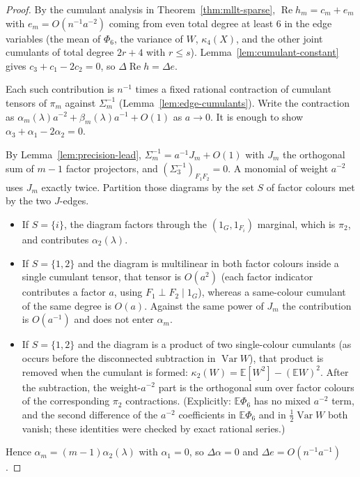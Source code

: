 \documentclass[11pt]{article}
\newcommand{\EE}{\mathbb{E}}
\begin{document}
\begin{proof}
By the cumulant analysis in Theorem~\ref{thm:mllt-sparse},
\(\operatorname{Re}h_m=c_m+e_m\) with \(e_m=O(n^{-1}a^{-2})\) coming from even
total degree at least \(6\) in the edge variables (the mean of
\(\Phi_6\), the variance of \(W\), \(\kappa_4(X)\), and the other joint
cumulants of total degree \(2r+4\) with \(r\le s\)).
Lemma~\ref{lem:cumulant-constant} gives \(c_3+c_1-2c_2=0\), so
\(\Delta\operatorname{Re}h=\Delta e\).

Each such contribution is \(n^{-1}\) times a fixed rational contraction of
cumulant tensors of \(\pi_m\) against \(\Sigma_m^{-1}\) (Lemma~\ref{lem:edge-cumulants}).
Write the contraction as \(\alpha_m(\lambda)a^{-2}+\beta_m(\lambda)a^{-1}+O(1)\)
as \(a\to0\). It is enough to show \(\alpha_3+\alpha_1-2\alpha_2=0\).

By Lemma~\ref{lem:precision-lead}, \(\Sigma_m^{-1}=a^{-1}J_m+O(1)\) with
\(J_m\) the orthogonal sum of \(m-1\) factor projectors, and
\((\Sigma_3^{-1})_{F_1F_2}=0\). A monomial of weight \(a^{-2}\) uses
\(J_m\) exactly twice. Partition those diagrams by the set \(S\) of factor
colours met by the two \(J\)-edges.
\begin{itemize}
\item If \(S=\{i\}\), the diagram factors through the
\((1_G,1_{F_i})\) marginal, which is \(\pi_2\), and contributes
\(\alpha_2(\lambda)\).
\item If \(S=\{1,2\}\) and the diagram is multilinear in both factor
colours inside a single cumulant tensor, that tensor is \(O(a^2)\)
(each factor indicator contributes a factor \(a\), using
\(F_1\perp F_2\mid 1_G\)), whereas a same-colour cumulant of the same
degree is \(O(a)\). Against the same power of \(J_m\) the contribution is
\(O(a^{-1})\) and does not enter \(\alpha_m\).
\item If \(S=\{1,2\}\) and the diagram is a product of two single-colour
cumulants (as occurs before the disconnected subtraction in
\(\operatorname{Var}W\)), that product is removed when the cumulant is formed:
\(\kappa_2(W)=\EE[W^2]-(\EE W)^2\). After the subtraction, the
weight-\(a^{-2}\) part is the orthogonal sum over factor colours of the
corresponding \(\pi_2\) contractions. (Explicitly:
\(\EE\Phi_6\) has no mixed \(a^{-2}\) term, and the second difference of the
\(a^{-2}\) coefficients in \(\EE\Phi_6\) and in \(\tfrac12\operatorname{Var}W\) both
vanish; these identities were checked by exact rational series.)
\end{itemize}
Hence \(\alpha_m=(m-1)\alpha_2(\lambda)\) with \(\alpha_1=0\), so
\(\Delta\alpha=0\) and \(\Delta e=O(n^{-1}a^{-1})\).
\end{proof}
\end{document}
